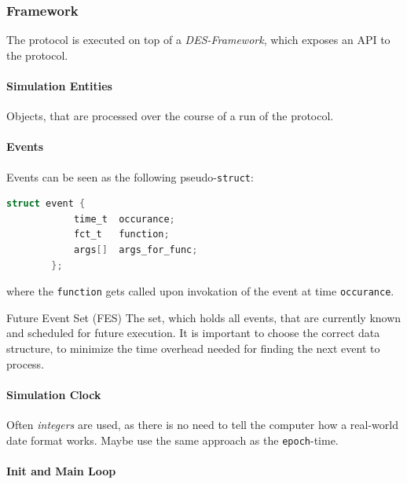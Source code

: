 \documentclass[english]{panikzettel}
\begin{document}
	\subsubsection{Framework}
	\label{sss:discrete-event-simulation:framework}
	
	The protocol is executed on top of a \textit{DES-Framework}, which exposes an API to the protocol.

	\paragraph{Simulation Entities}
	\label{pgf:framework:simulation-entities}
	
	Objects, that are processed over the course of a run of the protocol.

	\paragraph{Events}
	\label{pgf:framework:events}
	
	Events can be seen as the following pseudo-\texttt{struct}:
	\begin{lstlisting}[language=C]
		struct event {
			time_t 	occurance;
			fct_t	function;
			args[] 	args_for_func;
		};
	\end{lstlisting}
	
	where the \texttt{function} gets called upon invokation of the event at time \texttt{occurance}.

	\begin{defi}{Future Event Set (FES)}
		The set, which holds all events, that are currently known and scheduled for future execution.
		\tcblower
		It is important to choose the correct data structure, to minimize the time overhead needed for finding the next event to process.
	\end{defi}
	
	\paragraph{Simulation Clock}
	\label{pgf:framework:simulation-clock}
	
	Often \textit{integers} are used, as there is no need to tell the computer how a real-world date format works. 
	Maybe use the same approach as the \texttt{epoch}-time.

	\paragraph{Init and Main Loop}
	\label{pgf:framework:init-and-main-loop}
	
\end{document}
